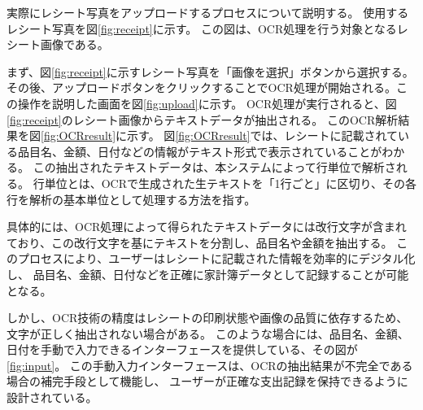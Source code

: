 \documentclass[main]{subfiles}
\begin{document}

実際にレシート写真をアップロードするプロセスについて説明する。
使用するレシート写真を図\ref{fig:receipt}に示す。
この図は、OCR処理を行う対象となるレシート画像である。

まず、図\ref{fig:receipt}に示すレシート写真を「画像を選択」ボタンから選択する。
その後、アップロードボタンをクリックすることでOCR処理が開始される。この操作を説明した画面を図\ref{fig:upload}に示す。
OCR処理が実行されると、図\ref{fig:receipt}のレシート画像からテキストデータが抽出される。
このOCR解析結果を図\ref{fig:OCRresult}に示す。
図\ref{fig:OCRresult}では、レシートに記載されている品目名、金額、日付などの情報がテキスト形式で表示されていることがわかる。
この抽出されたテキストデータは、本システムによって行単位で解析される。
行単位とは、OCRで生成された生テキストを「1行ごと」に区切り、その各行を解析の基本単位として処理する方法を指す。

具体的には、OCR処理によって得られたテキストデータには改行文字が含まれており、この改行文字を基にテキストを分割し、品目名や金額を抽出する。
このプロセスにより、ユーザーはレシートに記載された情報を効率的にデジタル化し、
品目名、金額、日付などを正確に家計簿データとして記録することが可能となる。

しかし、OCR技術の精度はレシートの印刷状態や画像の品質に依存するため、文字が正しく抽出されない場合がある。
このような場合には、品目名、金額、日付を手動で入力できるインターフェースを提供している、その図が\ref{fig:input}。
この手動入力インターフェースは、OCRの抽出結果が不完全である場合の補完手段として機能し、
ユーザーが正確な支出記録を保持できるように設計されている。
\end{document}
